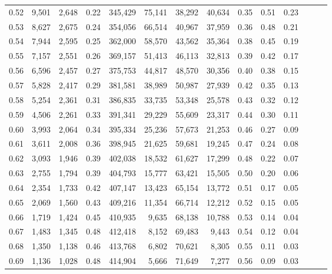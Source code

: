 \begin{tabular}{rrrrrrrrrrrrrr}
0.52 &   9,501 &  2,648 &  0.22 &  345,429 &   75,141 &  38,292 &  40,634 &  0.35 &  0.51 &      0.23 \\
0.53 &   8,627 &  2,675 &  0.24 &  354,056 &   66,514 &  40,967 &  37,959 &  0.36 &  0.48 &      0.21 \\
0.54 &   7,944 &  2,595 &  0.25 &  362,000 &   58,570 &  43,562 &  35,364 &  0.38 &  0.45 &      0.19 \\
0.55 &   7,157 &  2,551 &  0.26 &  369,157 &   51,413 &  46,113 &  32,813 &  0.39 &  0.42 &      0.17 \\
0.56 &   6,596 &  2,457 &  0.27 &  375,753 &   44,817 &  48,570 &  30,356 &  0.40 &  0.38 &      0.15 \\
0.57 &   5,828 &  2,417 &  0.29 &  381,581 &   38,989 &  50,987 &  27,939 &  0.42 &  0.35 &      0.13 \\
0.58 &   5,254 &  2,361 &  0.31 &  386,835 &   33,735 &  53,348 &  25,578 &  0.43 &  0.32 &      0.12 \\
0.59 &   4,506 &  2,261 &  0.33 &  391,341 &   29,229 &  55,609 &  23,317 &  0.44 &  0.30 &      0.11 \\
0.60 &   3,993 &  2,064 &  0.34 &  395,334 &   25,236 &  57,673 &  21,253 &  0.46 &  0.27 &      0.09 \\
0.61 &   3,611 &  2,008 &  0.36 &  398,945 &   21,625 &  59,681 &  19,245 &  0.47 &  0.24 &      0.08 \\
0.62 &   3,093 &  1,946 &  0.39 &  402,038 &   18,532 &  61,627 &  17,299 &  0.48 &  0.22 &      0.07 \\
0.63 &   2,755 &  1,794 &  0.39 &  404,793 &   15,777 &  63,421 &  15,505 &  0.50 &  0.20 &      0.06 \\
0.64 &   2,354 &  1,733 &  0.42 &  407,147 &   13,423 &  65,154 &  13,772 &  0.51 &  0.17 &      0.05 \\
0.65 &   2,069 &  1,560 &  0.43 &  409,216 &   11,354 &  66,714 &  12,212 &  0.52 &  0.15 &      0.05 \\
0.66 &   1,719 &  1,424 &  0.45 &  410,935 &    9,635 &  68,138 &  10,788 &  0.53 &  0.14 &      0.04 \\
0.67 &   1,483 &  1,345 &  0.48 &  412,418 &    8,152 &  69,483 &   9,443 &  0.54 &  0.12 &      0.04 \\
0.68 &   1,350 &  1,138 &  0.46 &  413,768 &    6,802 &  70,621 &   8,305 &  0.55 &  0.11 &      0.03 \\
0.69 &   1,136 &  1,028 &  0.48 &  414,904 &    5,666 &  71,649 &   7,277 &  0.56 &  0.09 &      0.03 \\

\end{tabular}
